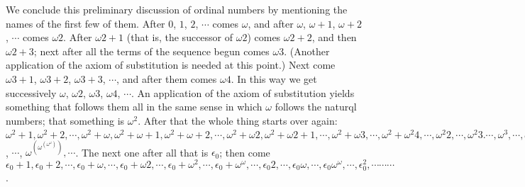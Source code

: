 We conclude this preliminary discussion of ordinal numbers by mentioning the names of the first few of them. After $0$, $1$, $2$, $\cdots$ comes $\omega$, and after $\omega$, $\omega + 1$, $\omega + 2$, $\cdots$ comes $\omega 2$. After $\omega 2 + 1$ (that is, the successor of $\omega 2$) comes $\omega 2 + 2$, and then $\omega 2 + 3$; next after all the terms of the sequence begun comes $\omega 3$. (Another application of the axiom of substitution is needed at this point.) Next come $\omega 3 + 1$, $\omega 3 + 2$, $\omega 3 + 3$, $\cdots$, and after them comes $\omega 4$. In this way we get successively $\omega$, $\omega 2$, $\omega 3$, $\omega 4$, $\cdots$. An application of the axiom of substitution yields something that follows them all in the same sense in which $\omega$ follows the naturql numbers; that something is $\omega^{2}$. After that the whole thing starts over again: $\omega^{2} + 1, \omega^{2} + 2, \cdots, \omega^{2} + \omega, \omega^{2} + \omega + 1, \omega^{2} + \omega + 2, \cdots , \omega^{2} + \omega 2, \omega^{2} + \omega 2 + 1, \cdots , \omega^{2} + \omega 3, \cdots, \omega^{2} + \omega^{2} 4, \cdots, \omega^{2} 2, \cdots, \omega^{2} 3. \cdots, \omega^{3}, \cdots, \omega^{4}, \cdots, \omega^{\omega}, \cdots, \omega^{(\omega^{\omega})}$, $ \cdots$, $ \omega^{(\omega^{(\omega^{\omega})})} , \cdots $. The next one after all that is $\epsilon_{0}$; then come $\epsilon_{0} + 1, \epsilon_{0} +2, \cdots, \epsilon_{0} + \omega, \cdots, \epsilon_{0} + \omega 2, \cdots, \epsilon_{0} + \omega^{2}, \cdots, \epsilon_{0} + \omega^{\omega}, \cdots, \epsilon_{0} 2, \cdots, \epsilon_{0} \omega, \cdots, \epsilon_{0} \omega^{\omega}, \cdots, \epsilon_{0}^{2}, \cdots \cdots \cdots$.